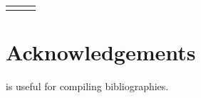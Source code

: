 \documentclass[output=paper]{langscibook}
\begin{document}
\begin{table}
    \caption{}
    \label{tab:1:}
    \begin{tabular}{lll}
        \lsptoprule
         
        \midrule
        
        \lspbottomrule
    \end{tabular}
\end{table}


\section*{Acknowledgements}
\citet{Nordhoff2018} is useful for compiling bibliographies.

{\sloppy\printbibliography[heading=subbibliography,notkeyword=this]}
\end{document}
